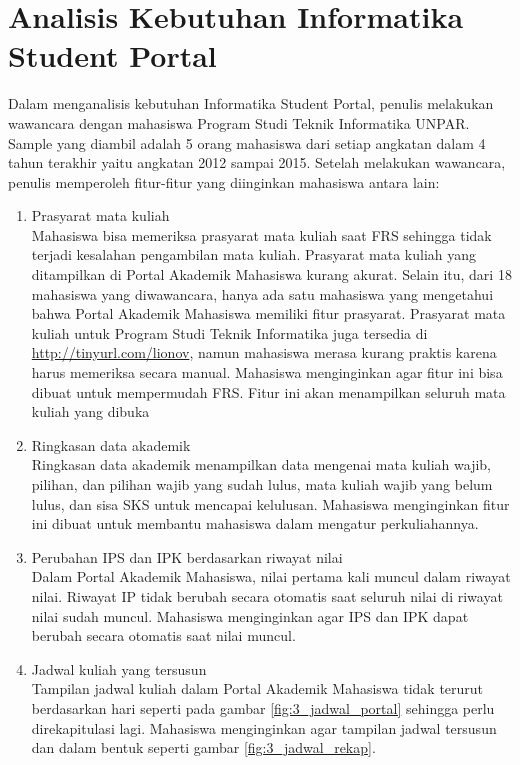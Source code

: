 \section{Analisis Kebutuhan Informatika Student Portal}
\label{sec:kebutuhan}
Dalam menganalisis kebutuhan Informatika Student Portal, penulis melakukan wawancara dengan mahasiswa Program Studi Teknik Informatika UNPAR. Sample yang diambil adalah 5 orang mahasiswa dari setiap angkatan dalam 4 tahun terakhir yaitu angkatan 2012 sampai 2015. Setelah melakukan wawancara, penulis memperoleh fitur-fitur yang diinginkan mahasiswa antara lain:
\begin{enumerate}
	\item Prasyarat mata kuliah\\
	Mahasiswa bisa memeriksa prasyarat mata kuliah saat FRS sehingga tidak terjadi kesalahan pengambilan mata kuliah. Prasyarat mata kuliah yang ditampilkan di Portal Akademik Mahasiswa kurang akurat. Selain itu, dari 18 mahasiswa yang diwawancara, hanya ada satu mahasiswa yang mengetahui bahwa Portal Akademik Mahasiswa memiliki fitur prasyarat. Prasyarat mata kuliah untuk Program Studi Teknik Informatika juga tersedia di \url{http://tinyurl.com/lionov}, namun mahasiswa merasa kurang praktis karena harus memeriksa secara manual. Mahasiswa menginginkan agar fitur ini bisa dibuat untuk mempermudah FRS. Fitur ini akan menampilkan seluruh mata kuliah yang dibuka
	\item Ringkasan data akademik\\
	Ringkasan data akademik menampilkan data mengenai mata kuliah wajib, pilihan, dan pilihan wajib yang sudah lulus, mata kuliah wajib yang belum lulus, dan sisa SKS untuk mencapai kelulusan. Mahasiswa menginginkan fitur ini dibuat untuk membantu mahasiswa dalam mengatur perkuliahannya.
	\item Perubahan IPS dan IPK berdasarkan riwayat nilai\\
	Dalam Portal Akademik Mahasiswa, nilai pertama kali muncul dalam riwayat nilai. Riwayat IP tidak berubah secara otomatis saat seluruh nilai di riwayat nilai sudah muncul. Mahasiswa menginginkan agar IPS dan IPK dapat berubah secara otomatis saat nilai muncul.
	\item Jadwal kuliah yang tersusun\\
	Tampilan jadwal kuliah dalam Portal Akademik Mahasiswa tidak terurut berdasarkan hari seperti pada gambar \ref{fig:3_jadwal_portal} sehingga perlu direkapitulasi lagi. Mahasiswa menginginkan agar tampilan jadwal tersusun dan dalam bentuk seperti gambar \ref{fig:3_jadwal_rekap}.

\end{enumerate}
